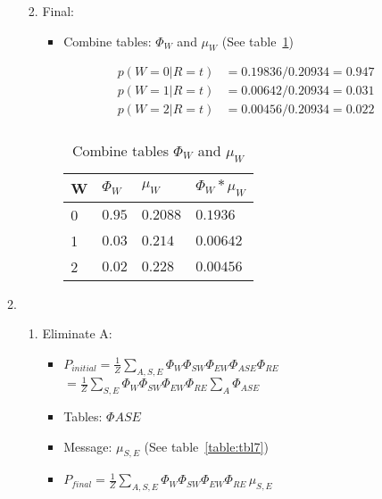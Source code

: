 \documentclass{article}
\begin{document}
\begin{enumerate}[label=(\alph*)]
\begin{enumerate}[label=\roman*.]
\begin{enumerate}[label=\alph*.]
\begin{itemize}
\end{itemize}

\item Final:

\begin{itemize}

\item Combine tables: $\Phi_W$ and $\mu_W$ (See table~\ref{table:tbl6})

\begin{align*}
p(W=0|R=t)&=0.19836/0.20934=0.947 \\
p(W=1|R=t)&=0.00642/0.20934=0.031 \\
p(W=2|R=t)&=0.00456/0.20934=0.022 \\
\end{align*}

\begin{table}[h]
\centering
\caption{Combine tables $\Phi_W$ and $\mu_W$}
\label{table:tbl6}
\begin{tabular}{|l|l|l|l|}
\hline
 W  & $\Phi_W$ & $\mu_W$ &  $\Phi_W * \mu_W$ \\
\hline \hline
0 & $0.95$ & $0.2088$ &  $0.1936$ \\
1 & $0.03$ & $0.214$ & $0.00642$  \\
2 & $0.02$ & $0.228$ & $0.00456$ \\
\hline
\end{tabular}
\end{table}

\end{itemize}

\end{enumerate}

\item

\begin{enumerate}[label=\alph*.]

\item Eliminate A:

\begin{itemize}

\item $P_{initial}=\frac{1}{Z}\sum_{A,S,E}\Phi_{W}\Phi_{SW}\Phi_{EW}\Phi_{ASE}\Phi_{RE}$ 
$=\frac{1}{Z}\sum_{S,E}\Phi_{W}\Phi_{SW}\Phi_{EW}\Phi_{RE}\sum_A\Phi_{ASE}$

\item Tables: $\Phi{ASE}$

\item Message: $\mu_{S,E}$ (See table~\ref{table:tbl7})

\item $P_{final}=\frac{1}{Z}\sum_{A,S,E}\Phi_{W}\Phi_{SW}\Phi_{EW}\Phi_{RE}\,\mu_{S,E}$ 


\end{itemize}
\end{enumerate}
\end{enumerate}
\end{enumerate}
\end{document}
